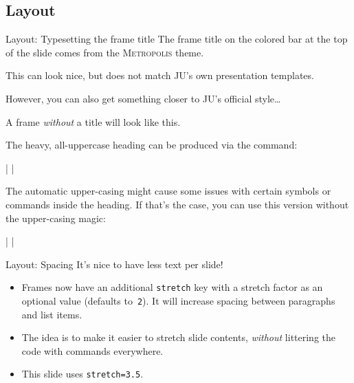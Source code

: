 \documentclass[10pt]{beamer}
\begin{document}
\subsection{Layout}

\begin{frame}[stretch=5]{Layout: Typesetting the frame title}
  The frame title on the \alert{colored bar} at the top of the slide comes from the \textsc{Metropolis} theme.

  This can look nice, but \alert{does not match JU's own presentation templates.}
  
  However, you can also get something closer to JU's official style\ldots
\end{frame}

\begin{frame}[fragile,stretch=1.5]
  
  A frame \emph{without} a title will look like this.
  
  The heavy, all-uppercase heading can be produced via the command:
  
    |   |

  The automatic upper-casing might cause some issues with certain symbols or commands inside the heading.  If that's the case, you can use this version without the upper-casing magic:

    |   |
\end{frame}

\begin{frame}[fragile,stretch=3.5]{Layout: Spacing}
It's nice to have less text per slide!

\begin{itemize}
    \item Frames now have an additional \alert{\texttt{stretch}} key with a stretch factor as an optional value (defaults to~\texttt{2}).  It will \alert{increase spacing} between paragraphs and list items.

    \item The idea is to make it easier to stretch slide contents, \emph{without} littering the code with \texttt{\vspace{...}} commands everywhere.

    \item This slide uses \texttt{stretch=3.5}.
\end{itemize}

\end{frame}
\end{document}

